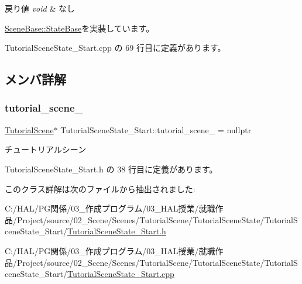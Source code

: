 \begin{DoxyRetVals}{戻り値}
{\em void} & なし \\
\hline
\end{DoxyRetVals}


\mbox{\hyperlink{class_scene_base_1_1_state_base_ad2c6c8fd9f020eb02f64f394edee129c}{Scene\+Base\+::\+State\+Base}}を実装しています。



 Tutorial\+Scene\+State\+\_\+\+Start.\+cpp の 69 行目に定義があります。



\subsection{メンバ詳解}
\mbox{\label{class_tutorial_scene_state___start_a1fea5f4f4713a1461a86cbc9fc263e41}} 
\subsubsection{\texorpdfstring{tutorial\+\_\+scene\+\_\+}{tutorial\_scene\_}}
{\footnotesize\ttfamily \mbox{\hyperlink{class_tutorial_scene}{Tutorial\+Scene}}$\ast$ Tutorial\+Scene\+State\+\_\+\+Start\+::tutorial\+\_\+scene\+\_\+ = nullptr\hspace{0.3cm}{\ttfamily [protected]}}



チュートリアルシーン 



 Tutorial\+Scene\+State\+\_\+\+Start.\+h の 38 行目に定義があります。



このクラス詳解は次のファイルから抽出されました\+:\begin{DoxyCompactItemize}
\item 
C\+:/\+H\+A\+L/\+P\+G関係/03\+\_\+作成プログラム/03\+\_\+\+H\+A\+L授業/就職作品/\+Project/source/02\+\_\+\+Scene/\+Scenes/\+Tutorial\+Scene/\+Tutorial\+Scene\+State/\+Tutorial\+Scene\+State\+\_\+\+Start/\mbox{\hyperlink{_tutorial_scene_state___start_8h}{Tutorial\+Scene\+State\+\_\+\+Start.\+h}}\item 
C\+:/\+H\+A\+L/\+P\+G関係/03\+\_\+作成プログラム/03\+\_\+\+H\+A\+L授業/就職作品/\+Project/source/02\+\_\+\+Scene/\+Scenes/\+Tutorial\+Scene/\+Tutorial\+Scene\+State/\+Tutorial\+Scene\+State\+\_\+\+Start/\mbox{\hyperlink{_tutorial_scene_state___start_8cpp}{Tutorial\+Scene\+State\+\_\+\+Start.\+cpp}}\end{DoxyCompactItemize}
